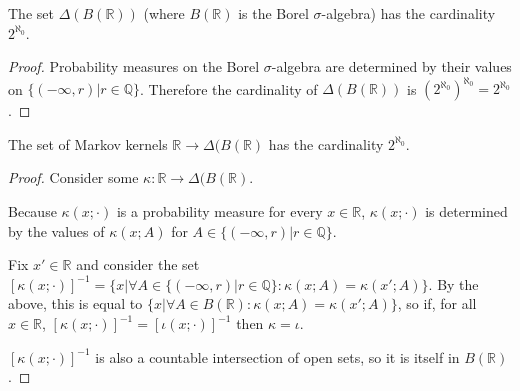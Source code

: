 \begin{lemma}
The set $\Delta(B(\mathbb{R}))$ (where $B(\mathbb{R})$ is the Borel $\sigma$-algebra) has the cardinality $2^{\aleph_0}$.
\end{lemma}

\begin{proof}
Probability measures on the Borel $\sigma$-algebra are determined by their values on $\{(-\infty,r)|r\in \mathbb{Q}\}$. Therefore the cardinality of $\Delta(B(\mathbb{R}))$ is $(2^{\aleph_0})^{\aleph_0}=2^{\aleph_0}$.
\end{proof}

\begin{lemma}
The set of Markov kernels $\mathbb{R}\to \Delta(B(\mathbb{R})$ has the cardinality $2^{\aleph_0}$.
\end{lemma}

\begin{proof}
Consider some $\kappa:\mathbb{R}\to \Delta(B(\mathbb{R})$.

Because $\kappa(x;\cdot)$ is a probability measure for every $x\in \mathbb{R}$, $\kappa(x;\cdot)$ is determined by the values of $\kappa(x;A)$ for $A\in \{(-\infty,r)|r\in \mathbb{Q}\}$.

Fix $x'\in \mathbb{R}$ and consider the set $[\kappa(x;\cdot)]^{-1} = \{x|\forall A\in \{(-\infty,r)|r\in \mathbb{Q}\}:\kappa(x;A) = \kappa(x';A)\}$. By the above, this is equal to $\{x|\forall A\in B(\mathbb{R}):\kappa(x;A) = \kappa(x';A)\}$, so if, for all $x\in \mathbb{R}$, $[\kappa(x;\cdot)]^{-1}=[\iota(x;\cdot)]^{-1}$ then $\kappa=\iota$. 

$[\kappa(x;\cdot)]^{-1}$ is also a countable intersection of open sets, so it is itself in $B(\mathbb{R})$.

\end{proof}